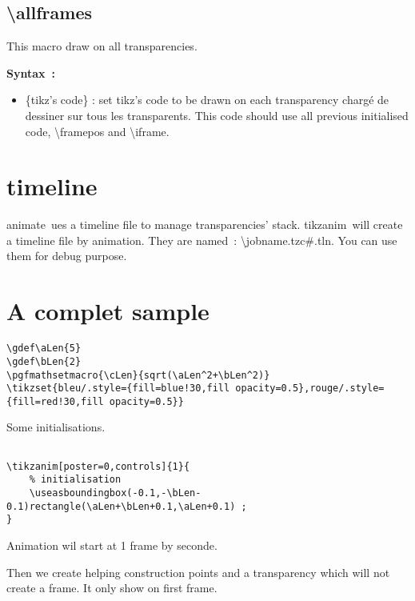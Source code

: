 \documentclass[a4paper,12pt]{article}
\newcommand\Tikz{{\ttfamily tikz}}
\newcommand\TikzAnimate{{\ttfamily tikzanim}}
\newcommand\Animate{{\ttfamily animate}}
\begin{document}
\subsection{\ttfamily\textbackslash allframes}

This macro draw on all transparencies.

\textbf{Syntax~:}


	\begin{itemize}
		\item {\ttfamily\{tikz's code\}} : set \Tikz's code to be drawn on each transparency chargé de dessiner sur tous les transparents. This code should use all previous initialised code,
		{\ttfamily\textbackslash framepos} and {\ttfamily\textbackslash iframe}.
	\end{itemize}
	
\section{\ttfamily timeline}

\Animate\ ues a {\ttfamily timeline} file to manage transparencies' stack. \TikzAnimate\ will create a {\ttfamily timeline} file by animation. They are named~: {\ttfamily \textbackslash jobname.tzc\#.tln}. You can use them for debug purpose.
	
\section{A complet sample}

\begin{lstlisting}[name=exemplecomplet]
\gdef\aLen{5}
\gdef\bLen{2}
\pgfmathsetmacro{\cLen}{sqrt(\aLen^2+\bLen^2)}
\tikzset{bleu/.style={fill=blue!30,fill opacity=0.5},rouge/.style={fill=red!30,fill opacity=0.5}} 
\end{lstlisting}

Some initialisations.


\begin{lstlisting}[name=exemplecomplet]

\tikzanim[poster=0,controls]{1}{
	% initialisation 
	\useasboundingbox(-0.1,-\bLen-0.1)rectangle(\aLen+\bLen+0.1,\aLen+0.1) ;
}	
\end{lstlisting}

Animation wil start at 1 frame by seconde.

Then we create helping construction points and a transparency which will not create a frame. It only show on first frame.
\end{document}
